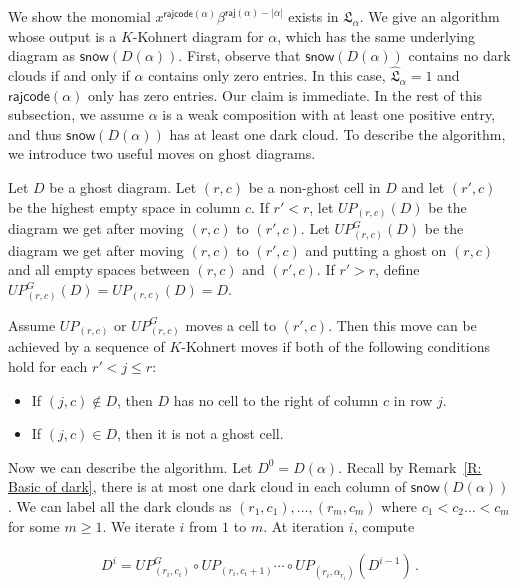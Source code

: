 \documentclass[ALCO]{cedram}
\newcommand{\fL}{\mathfrak{L}}
\newcommand{\fLb}{\fL}
\newcommand{\topLas}{\widehat{\fL}}
\newcommand{\snow}{\mathsf{snow}}
\newcommand{\rajcode}{\mathsf{rajcode}}
\newcommand{\raj}{\mathsf{raj}}
\begin{document}
We show the monomial $ x^{\rajcode(\alpha)}\beta^{\raj(\alpha) - |\alpha|}$ 
exists in $\fLb_\alpha$.
We give an algorithm whose output is a $K$-Kohnert diagram for $\alpha$, which has the same underlying diagram as $\snow(D(\alpha))$. First, observe that $\snow(D(\alpha))$ contains no dark clouds if and only if $\alpha$ contains only zero entries. In this case, $\topLas_\alpha = 1$ and $\rajcode(\alpha)$ only has zero entries. Our claim is immediate. 
In the rest of this subsection, we assume $\alpha$ is a weak composition
with at least one positive entry, and thus $\snow(D(\alpha))$ has at least one dark cloud.
To describe the algorithm, 
we introduce two useful moves on ghost diagrams.
\begin{defn}
Let $D$ be a ghost diagram.
Let $(r,c)$ be a non-ghost cell in $D$
and let $(r', c)$ be the highest empty space in column $c$.
If $r' < r$,
let $UP_{(r,c)}(D)$ be the diagram we get after 
moving $(r,c)$ to $(r',c)$. 
Let $UP^G_{(r,c)}(D)$ be the diagram we get after 
moving $(r,c)$ to $(r',c)$
and putting a ghost on $(r,c)$ and all empty spaces between $(r,c)$ and $(r',c)$.
If $r' > r$, define 
$UP^G_{(r,c)}(D) = UP_{(r,c)}(D) = D$.
\end{defn}

\begin{rem}
\label{R: K-Kohnert move}
Assume $UP_{(r,c)}$ or $UP^G_{(r,c)}$ moves a cell to $(r',c)$.
Then this move can be achieved by a sequence of $K$-Kohnert moves
if both of the following conditions hold for each $r' < j \leq r$:
\begin{itemize}
\item If $(j, c)\notin D$,
then $D$ has no cell to the right of column $c$ in row $j$.
\item If $(j, c)\in D$, then it is not a ghost cell.
\end{itemize}
\end{rem}


Now we can describe the algorithm.
Let $D^{0} = D(\alpha)$. Recall by Remark~\ref{R: Basic of dark}, there is at most one dark cloud in each column of $\snow(D(\alpha))$. 
We can label all the dark clouds as $(r_1,c_1),\dots, (r_{m},c_{m})$ where $c_1<c_2\dots <c_m$ for some $m\geqslant 1$. We iterate $i$ from $1$ to $m$.
At iteration $i$, compute

\begin{align}
\label{EQ: UP}
D^i = UP^G_{(r_i,c_i)} \circ UP_{(r_i,c_i + 1)} \cdots \circ UP_{(r_i,\alpha_{r_i})} (D^{i-1})\,.    
\end{align}
\end{document}
